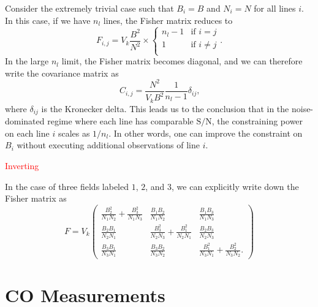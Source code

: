 \documentclass{aastex62}
\newcommand{\Gus}[1]{\textcolor{red}{#1}}
\newcommand{\beq}{\begin{equation}}
\newcommand{\eeq}{\end{equation}}
\begin{document}
Consider the extremely trivial case such that $B_i = B$ and $N_i = N$ for all
lines $i$. In this case, if we have $n_l$ lines, the Fisher matrix reduces to
\beq\label{eq:fisher_supertrivial}
        F_{i,j} = V_k \frac{B^2}{N^2} \times
        \begin{cases}
             n_l-1 & \text{if $i=j$} \\
             1 &\text{if $i\neq j$} \\
        \end{cases}\text{.}
\eeq
In the large $n_l$ limit, the Fisher matrix becomes diagonal, and we can
therefore write the covariance matrix as
\beq\label{eq:cov_supertrivial_largen}
C_{i,j} = \frac{N^2}{V_k B^2} \frac{1}{n_l-1} \delta_{ij}\text{,}
\eeq
where $\delta_{ij}$ is the Kronecker delta. This leads us to the conclusion
that in the noise-dominated regime where each line has comparable
$\text{S}/\text{N}$, the constraining power on each line $i$ scales as
$1/n_l$. In other words, one can improve the constraint on $B_i$ without
executing additional observations of line $i$.

\Gus{Inverting}

In the case of three fields labeled $1$, $2$, and $3$, we can explicitly write
down the Fisher matrix as
\beq
F = V_k
\begin{pmatrix}
\frac{B_2^2}{N_1N_2}+\frac{B_3^2}{N_1N_3} & \frac{B_1B_2}{N_1N_2} & \frac{B_1B_3}{N_1N_3} \\
\frac{B_2B_1}{N_2N_1} & \frac{B_3^2}{N_2N_3}+\frac{B_1^2}{N_2N_1} & \frac{B_2B_3}{N_2N_3} \\
\frac{B_3B_1}{N_3N_1} & \frac{B_3B_2}{N_3N_2} & \frac{B_1^2}{N_3N_1}+\frac{B_2^2}{N_3N_2}\text{.}
\end{pmatrix}
\eeq



\section{CO Measurements} \label{sec:co_measurements}
\end{document}

